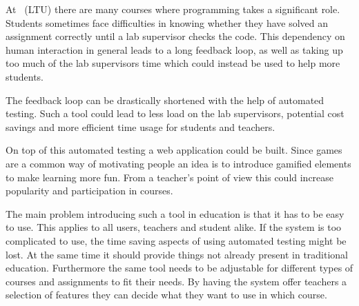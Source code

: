 At \LTU\ (LTU) there are many courses where programming takes a significant role. Students sometimes face difficulties in knowing whether they have solved an assignment correctly until a lab supervisor checks the code. This dependency on human interaction in general leads to a long feedback loop, as well as taking up too much of the lab supervisors time which could instead be used to help more students. 

The feedback loop can be drastically shortened with the help of automated testing. Such a tool could lead to less load on the lab supervisors, potential cost savings and more efficient time usage for students and teachers.

On top of this automated testing a web application could be built. Since games are a common way of motivating people an idea is to introduce gamified elements to make learning more fun. From a teacher's point of view this could increase popularity and participation in courses.

The main problem introducing such a tool in education is that it has to be easy to use. This applies to all users, teachers and student alike. If the system is too complicated to use, the time saving aspects of using automated testing might be lost. At the same time it should provide things not already present in traditional education. Furthermore the same tool needs to be adjustable for different types of courses and assignments to fit their needs. By having the system offer teachers a selection of features they can decide what they want to use in which course.